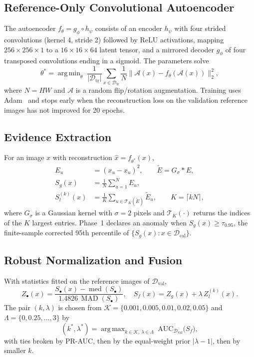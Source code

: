 \documentclass[conference]{IEEEtran}
\newcommand{\Etil}{\tilde{E}}
\DeclareMathOperator*{\argmin}{arg\,min}
\DeclareMathOperator*{\argmax}{arg\,max}
\DeclareMathOperator{\med}{med}
\DeclareMathOperator{\MAD}{MAD}
\begin{document}
\subsection{Reference-Only Convolutional Autoencoder}
The autoencoder $f_\theta=g_\phi\circ h_\psi$ consists of an encoder $h_\psi$ with four strided convolutions (kernel 4, stride 2) followed by ReLU activations, mapping $256\times256\times1$ to a $16\times16\times64$ latent tensor, and a mirrored decoder $g_\phi$ of four transposed convolutions ending in a sigmoid. The parameters solve
\begin{equation}
\theta^*=\argmin_{\theta}\;\frac{1}{|\mathcal{D}_{\mathrm{tr}}|}\sum_{x\in\mathcal{D}_{\mathrm{tr}}}\frac{1}{N}\big\lVert \mathcal{A}(x)-f_\theta(\mathcal{A}(x))\big\rVert_2^2,
\end{equation}
where $N=HW$ and $\mathcal{A}$ is a random flip/rotation augmentation. Training uses Adam~\cite{kingma2015} and stops early when the reconstruction loss on the validation reference images has not improved for 20 epochs.

\subsection{Evidence Extraction}
For an image $x$ with reconstruction $\hat x=f_{\theta^*}(x)$,
\begin{align}
E_u &= (x_u-\hat x_u)^2, \qquad \Etil = G_\sigma * E,\\
S_g(x) &= \frac{1}{N}\sum_{u=1}^{N} E_u,\\
S_l^{(k)}(x) &= \frac{1}{K}\sum_{u\in\mathcal{T}_K(\Etil)}\Etil_u,\qquad K=\lceil kN\rceil,
\end{align}
where $G_\sigma$ is a Gaussian kernel with $\sigma=2$ pixels and $\mathcal{T}_K(\cdot)$ returns the indices of the $K$ largest entries. Phase~1 declares an anomaly when $S_g(x)\ge\tau_{0.95}$, the finite-sample corrected 95th percentile of $\{S_g(x):x\in\mathcal{D}_{\mathrm{cal}}\}$.

\subsection{Robust Normalization and Fusion}
With statistics fitted on the reference images of $\mathcal{D}_{\mathrm{val}}$,
\begin{equation}
Z_\bullet(x)=\frac{S_\bullet(x)-\med(S_\bullet)}{1.4826\,\MAD(S_\bullet)},\quad
S_f(x)=Z_g(x)+\lambda\,Z_l^{(k)}(x).
\end{equation}
The pair $(k,\lambda)$ is chosen from $\mathcal{K}=\{0.001,0.005,0.01,0.02,0.05\}$ and $\Lambda=\{0,0.25,\dots,3\}$ by
\begin{equation}
(k^*,\lambda^*)=\argmax_{k\in\mathcal{K},\,\lambda\in\Lambda}\;\mathrm{AUC}_{\mathcal{D}_{\mathrm{val}}}\!\big(S_f\big),
\end{equation}
with ties broken by PR-AUC, then by the equal-weight prior $|\lambda-1|$, then by smaller $k$.
\end{document}
